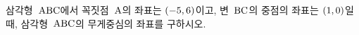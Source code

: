 삼각형~$\mathrm{ABC}$에서 꼭짓점~$\mathrm{A}$의 좌표는 $(-5{,}\mkern3mu\mathopen{}6)$이고, 변~$\mathrm{BC}$의 중점의 좌표는 $(1{,}\mkern3mu\mathopen{}0)$일 때, 삼각형~$\mathrm{ABC}$의 무게중심의 좌표를 구하시오.
